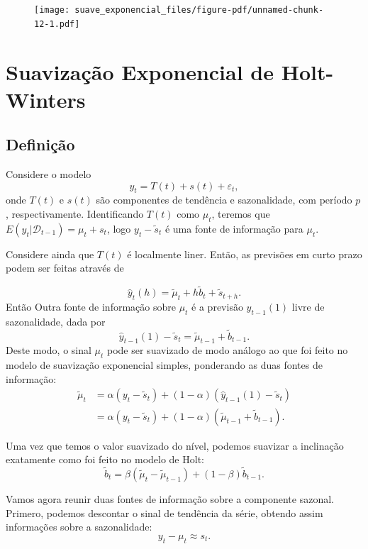 \documentclass[
  letterpaper,
  DIV=11,
  numbers=noendperiod]{scrreprt}
\theoremstyle{definition}
\theoremstyle{plain}
\theoremstyle{definition}
\theoremstyle{plain}
\theoremstyle{remark}
\begin{document}
\begin{figure}[H]

{\centering \texttt{[image: suave\_exponencial\_files/figure-pdf/unnamed-chunk-12-1.pdf]}

}

\end{figure}

\hypertarget{suavizauxe7uxe3o-exponencial-de-holt-winters}{%
\section{Suavização Exponencial de
Holt-Winters}\label{suavizauxe7uxe3o-exponencial-de-holt-winters}}

\hypertarget{definiuxe7uxe3o-1}{%
\subsection{Definição}\label{definiuxe7uxe3o-1}}

Considere o modelo \[y_t = T(t) + s(t)+\varepsilon_t,\] onde \(T(t)\) e
\(s(t)\) são componentes de tendência e sazonalidade, com período \(p\),
respectivamente. Identificando \(T(t)\) como \(\mu_t\), teremos que
\(E(y_t|\mathcal{D}_{t-1})=\mu_t+s_t\), logo \(y_t-\tilde{s}_t\) é uma
fonte de informação para \(\mu_t\).

Considere ainda que \(T(t)\) é localmente liner. Então, as previsões em
curto prazo podem ser feitas através de

\[\hat{y}_t(h) = \tilde{\mu}_t + h \tilde{b}_t + \tilde{s}_{t+h}.\]
Então Outra fonte de informação sobre \(\mu_t\) é a previsão
\(\hat{y}_{t-1}(1)\) livre de sazonalidade, dada por
\[\hat{y}_{t-1}(1)-\tilde{s}_{t}=\tilde{\mu}_{t-1} + \tilde{b}_{t-1}.\]
Deste modo, o sinal \(\mu_t\) pode ser suavizado de modo análogo ao que
foi feito no modelo de suavização exponencial simples, ponderando as
duas fontes de informação: \[\begin{align*}
     \tilde{\mu}_t &= \alpha ( y_t - \tilde{s}_t) + (1-\alpha) (\hat{y}_{t-1}(1) -\tilde{s}_{t})\\
     &= \alpha (y_t - \tilde{s}_t) + (1-\alpha) (\tilde{\mu}_{t-1}+ \tilde{b}_{t-1}).
    \end{align*}\]

Uma vez que temos o valor suavizado do nível, podemos suavizar a
inclinação exatamente como foi feito no modelo de Holt:
\[\tilde{b}_t = \beta (\tilde{\mu}_t - \tilde{\mu}_{t-1}) + (1-\beta) \tilde{b}_{t-1}.\]

Vamos agora reunir duas fontes de informação sobre a componente sazonal.
Primero, podemos descontar o sinal de tendência da série, obtendo assim
informações sobre a sazonalidade: \[y_t - \mu_t\approx s_t.\]
\end{document}
